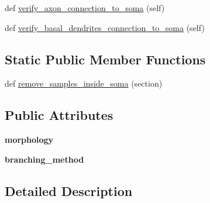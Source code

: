 \begin{DoxyCompactItemize}
\item 
def \hyperlink{classmeshy_1_1neuromorphovis_1_1morphologies_1_1morphology__repairer__for__piecewise__meshing_1_5044f04bfe44b29f28cb83006490b999_a830bda813b2a773c7122d73951628b4e}{verify\+\_\+axon\+\_\+connection\+\_\+to\+\_\+soma} (self)
\item 
def \hyperlink{classmeshy_1_1neuromorphovis_1_1morphologies_1_1morphology__repairer__for__piecewise__meshing_1_5044f04bfe44b29f28cb83006490b999_a8101fc44e26847929de003e5614df518}{verify\+\_\+basal\+\_\+dendrites\+\_\+connection\+\_\+to\+\_\+soma} (self)
\end{DoxyCompactItemize}
\subsection*{Static Public Member Functions}
\begin{DoxyCompactItemize}
\item 
def \hyperlink{classmeshy_1_1neuromorphovis_1_1morphologies_1_1morphology__repairer__for__piecewise__meshing_1_5044f04bfe44b29f28cb83006490b999_a2391a09753d96d02e11e70267daec927}{remove\+\_\+samples\+\_\+inside\+\_\+soma} (section)
\end{DoxyCompactItemize}
\subsection*{Public Attributes}
\begin{DoxyCompactItemize}
\item 
{\bfseries morphology}\hypertarget{classmeshy_1_1neuromorphovis_1_1morphologies_1_1morphology__repairer__for__piecewise__meshing_1_5044f04bfe44b29f28cb83006490b999_a87a7de855cd822e34a3b51508101250e}{}\label{classmeshy_1_1neuromorphovis_1_1morphologies_1_1morphology__repairer__for__piecewise__meshing_1_5044f04bfe44b29f28cb83006490b999_a87a7de855cd822e34a3b51508101250e}

\item 
{\bfseries branching\+\_\+method}\hypertarget{classmeshy_1_1neuromorphovis_1_1morphologies_1_1morphology__repairer__for__piecewise__meshing_1_5044f04bfe44b29f28cb83006490b999_abff13eb37ad123a83bc1ce3d0e829745}{}\label{classmeshy_1_1neuromorphovis_1_1morphologies_1_1morphology__repairer__for__piecewise__meshing_1_5044f04bfe44b29f28cb83006490b999_abff13eb37ad123a83bc1ce3d0e829745}

\end{DoxyCompactItemize}


\subsection{Detailed Description}



